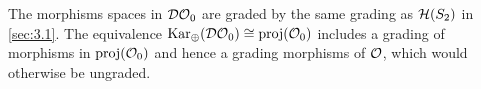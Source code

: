
\begin{remark}
    The morphisms spaces in $\mathcal{DO}_0$ are graded by the same grading as $\mathcal{H}(S_2)$ in \autoref{sec:3.1}. The equivalence $\operatorname{Kar_\oplus}(\mathcal{DO}_0) \cong \operatorname{proj}(\mathcal{O}_0)$ includes a grading of morphisms in $\operatorname{proj}(\mathcal{O}_0)$ and hence a grading morphisms of $\mathcal{O}$, which would otherwise be ungraded. 
\end{remark}

